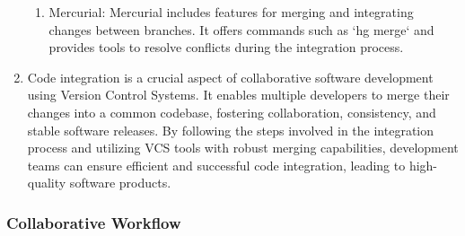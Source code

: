\begin{enumerate}
\begin{enumerate}
        \item Mercurial: Mercurial includes features for merging and integrating changes between branches. It offers commands such as `hg merge` and provides tools to resolve conflicts during the integration process.
    \end{enumerate}
    \item Code integration is a crucial aspect of collaborative software development using Version Control Systems. It enables multiple developers to merge their changes into a common codebase, fostering collaboration, consistency, and stable software releases. By following the steps involved in the integration process and utilizing VCS tools with robust merging capabilities, development teams can ensure efficient and successful code integration, leading to high-quality software products.
\end{enumerate}



\subsubsection*{Collaborative Workflow}

